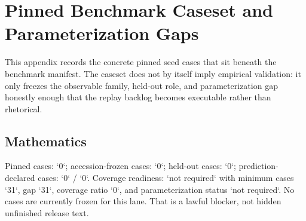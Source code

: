 \section{Pinned Benchmark Caseset and Parameterization Gaps}
\label{sec:oc-core-1-3-domain-benchmark-caseset}

This appendix records the concrete pinned seed cases that sit beneath the benchmark manifest. The caseset does not by itself imply empirical validation: it only freezes the observable family, held-out role, and parameterization gap honestly enough that the replay backlog becomes executable rather than rhetorical.

\begingroup
\footnotesize
\RaggedRight
\sloppy

\subsection{Mathematics}
Pinned cases: `0`; accession-frozen cases: `0`; held-out cases: `0`; prediction-declared cases: `0` / `0`.
Coverage readiness: `not required` with minimum cases `31`, gap `31`, coverage ratio `0`, and parameterization status `not required`.
No cases are currently frozen for this lane. That is a lawful blocker, not hidden unfinished release text.

